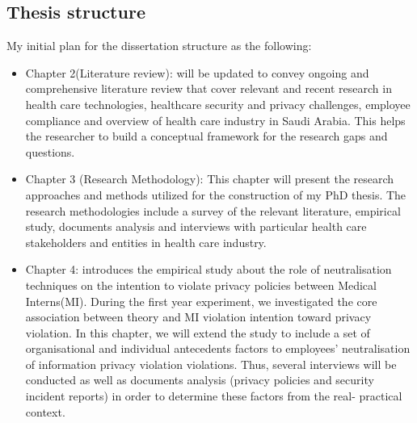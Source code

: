 \subsection {Thesis structure}
My initial plan for the dissertation structure as the following:
\begin{itemize}
	\item {Chapter 2(Literature review):} will be updated to convey ongoing and comprehensive literature review that cover relevant and recent research in health care technologies, healthcare security and privacy challenges, employee compliance and overview of health care industry in Saudi Arabia. This helps the researcher to build a conceptual framework for the research gaps and questions.
	\item {Chapter 3 (Research Methodology):} This chapter will present the research approaches and methods utilized for the construction of my PhD thesis. The research methodologies include a survey of the relevant literature, empirical study, documents analysis and interviews with particular health care stakeholders and entities in health care industry.
	\item {Chapter 4:} introduces the empirical study about the role of neutralisation techniques on the intention to violate privacy policies between Medical Interns(MI). During the first year experiment, we investigated the core association between theory and MI violation intention toward privacy violation. In this chapter, we will extend the study to include a set of organisational and individual antecedents factors to employees’ neutralisation of information privacy violation violations. Thus, several interviews will be conducted as well as documents analysis (privacy policies and security incident reports) in order to determine these factors from the real- practical context.
	

\end{itemize}

